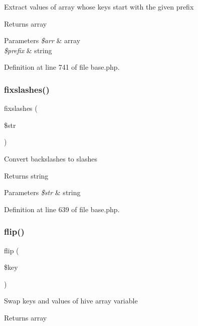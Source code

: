 Extract values of array whose keys start with the given prefix \begin{DoxyReturn}{Returns}
array 
\end{DoxyReturn}

\begin{DoxyParams}{Parameters}
{\em \$arr} & array \\
\hline
{\em \$prefix} & string \\
\hline
\end{DoxyParams}


Definition at line 741 of file base.\+php.

\hypertarget{class_base_a052692dd304d0f28451a8fc601fa277e}{}\label{class_base_a052692dd304d0f28451a8fc601fa277e} 
\subsubsection{\texorpdfstring{fixslashes()}{fixslashes()}}
{\footnotesize\ttfamily fixslashes (\begin{DoxyParamCaption}\item[{}]{\$str }\end{DoxyParamCaption})}

Convert backslashes to slashes \begin{DoxyReturn}{Returns}
string 
\end{DoxyReturn}

\begin{DoxyParams}{Parameters}
{\em \$str} & string \\
\hline
\end{DoxyParams}


Definition at line 639 of file base.\+php.

\hypertarget{class_base_a0b0020960192ed3b1d87f4c1a2587373}{}\label{class_base_a0b0020960192ed3b1d87f4c1a2587373} 
\subsubsection{\texorpdfstring{flip()}{flip()}}
{\footnotesize\ttfamily flip (\begin{DoxyParamCaption}\item[{}]{\$key }\end{DoxyParamCaption})}

Swap keys and values of hive array variable \begin{DoxyReturn}{Returns}
array 
\end{DoxyReturn}

